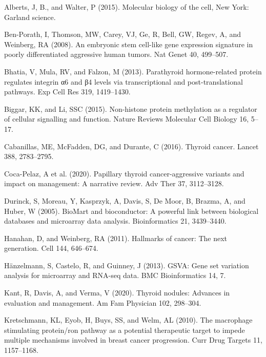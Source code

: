\documentclass[
  parskip,
  oneside]{scrreprt}
\newlength{\cslhangindent}
\newlength{\cslentryspacingunit} %
\newenvironment{CSLReferences}[2] %
 {%
  \setlength{\parindent}{0pt}
  \ifodd #1
  \let\oldpar\par
  \def\par{\hangindent=\cslhangindent\oldpar}
  \fi
  \setlength{\parskip}{#2\cslentryspacingunit}
 }%
 {}
\begin{document}
\hypertarget{refs}{}
\begin{CSLReferences}{0}{0}
\leavevmode{}%
Alberts, J, B., and Walter, P (2015). Molecular biology of the cell, New
York: Garland science.

\leavevmode{}%
Ben-Porath, I, Thomson, MW, Carey, VJ, Ge, R, Bell, GW, Regev, A, and
Weinberg, RA (2008). An embryonic stem cell-like gene expression
signature in poorly differentiated aggressive human tumors. Nat Genet
40, 499--507.

\leavevmode{}%
Bhatia, V, Mula, RV, and Falzon, M (2013). Parathyroid hormone-related
protein regulates integrin α6 and β4 levels via transcriptional and
post-translational pathways. Exp Cell Res 319, 1419--1430.

\leavevmode{}%
Biggar, KK, and Li, SSC (2015). Non-histone protein methylation as a
regulator of cellular signalling and function. Nature Reviews Molecular
Cell Biology 16, 5--17.

\leavevmode{}%
Cabanillas, ME, McFadden, DG, and Durante, C (2016). Thyroid cancer.
Lancet 388, 2783--2795.

\leavevmode{}%
Coca-Pelaz, A et al. (2020). Papillary thyroid cancer-aggressive
variants and impact on management: A narrative review. Adv Ther 37,
3112--3128.

\leavevmode{}%
Durinck, S, Moreau, Y, Kasprzyk, A, Davis, S, De Moor, B, Brazma, A, and
Huber, W (2005). BioMart and bioconductor: A powerful link between
biological databases and microarray data analysis. Bioinformatics 21,
3439--3440.

\leavevmode{}%
Hanahan, D, and Weinberg, RA (2011). Hallmarks of cancer: The next
generation. Cell 144, 646--674.

\leavevmode{}%
Hänzelmann, S, Castelo, R, and Guinney, J (2013). GSVA: Gene set
variation analysis for microarray and RNA-seq data. BMC Bioinformatics
14, 7.

\leavevmode{}%
Kant, R, Davis, A, and Verma, V (2020). Thyroid nodules: Advances in
evaluation and management. Am Fam Physician 102, 298--304.

\leavevmode{}%
Kretschmann, KL, Eyob, H, Buys, SS, and Welm, AL (2010). The macrophage
stimulating protein/ron pathway as a potential therapeutic target to
impede multiple mechanisms involved in breast cancer progression. Curr
Drug Targets 11, 1157--1168.


\end{CSLReferences}
\end{document}

